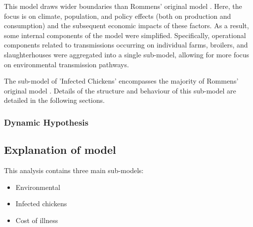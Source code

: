 This model draws wider boundaries than Rommens' original model \parencite{rommens_infected_2020}. Here, the focus is on climate, population, and policy effects (both on production and consumption) and the subsequent economic impacts of these factors. As a result, some internal components of the model were simplified. Specifically, operational components related to transmissions occurring on individual farms, broilers, and slaughterhouses were aggregated into a single sub-model, allowing for more focus on environmental transmission pathways.

The sub-model of 'Infected Chickens' encompasses the majority of Rommens' original model \parencite{rommens_infected_2020}. Details of the structure and behaviour of this sub-model are detailed in the following sections.

\subsubsection*{Dynamic Hypothesis}

\subsection{Explanation of model}
   
This analysis contains three main sub-models:

\begin{itemize}
    \item Environmental %
    \item Infected chickens %
    \item Cost of illness %

\end{itemize}

